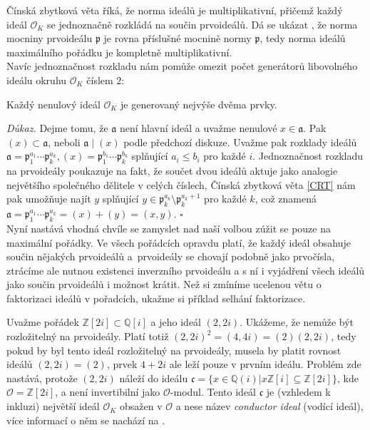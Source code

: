 \documentclass [12pt]{report}
\begin{document}
Čínská zbytková věta říká, že norma ideálů je multiplikativní, přičemž každý ideál $\mathcal{O}_K$ se jednoznačně rozkládá na součin prvoideálů. Dá se ukázat \cite[Věta 4.3.18.]{Pupik}, že norma mocniny prvoideálu $\mathfrak{p}$ je rovna příslušné mocnině normy $\mathfrak{p}$, tedy norma ideálů maximálního pořádku je kompletně multiplikativní.\\

Navíc jednoznačnost rozkladu nám pomůže omezit počet generátorů libovolného ideálu okruhu $\mathcal{O}_K$ číslem $2$:
\begin{veta}
Každý nenulový ideál $\mathcal{O}_K$ je generovaný nejvýše dvěma prvky.
\end{veta}
\noindent \textit{Důkaz.} Dejme tomu, že $\mathfrak{a}$ není hlavní ideál a uvažme nenulové $x \in \mathfrak{a}$. Pak $(x) \subset \mathfrak{a}$, neboli $\mathfrak{a} \mid (x)$ podle předchozí diskuze. Uvažme pak rozklady ideálů $\mathfrak{a} = \mathfrak{p}_1 ^{a_1} \cdots \mathfrak{p}_k ^ {a_k},(x) = \mathfrak{p}_1 ^{b_1} \cdots \mathfrak{p}_k ^{b_k}$ splňující $a_i \leqslant b_i$ pro každé $i$. Jednoznačnost rozkladu na prvoideály poukazuje na fakt, že součet dvou ideálů aktuje jako analogie největšího společného dělitele v celých číslech, Čínská zbytková věta \ref{CRT} nám pak umožňuje najít $y$ splňující $y \in \mathfrak{p}_k^{a_k} \setminus \mathfrak{p}_k^{a_k+1}$ pro každé $k$, což znamená $\mathfrak{a} = \mathfrak{p}_1 ^{a_1} \cdots \mathfrak{p}_k ^ {a_k} = (x)+(y) = (x,y)$. \hfill $\square$\\ 

Nyní nastává vhodná chvíle se zamyslet nad naší volbou zúžit se pouze na maximální pořádky. Ve všech pořádcích opravdu platí, že každý ideál obsahuje součin nějakých prvoideálů a~prvoideály se chovají podobně jako prvočísla, ztrácíme ale nutnou existenci inverzního prvoideálu a s ní i vyjádření všech ideálů jako součin prvoideálů i možnost krátit. Než si zmíníme ucelenou větu o faktorizaci ideálů v pořadcích, ukažme si příklad selhání faktorizace.

\begin{priklad}
Uvažme pořádek $\mathbb{Z}[2i] \subset \mathbb{Q}[i]$ a jeho ideál $(2,2i)$. Ukážeme, že nemůže být rozložitelný na prvoideály. Platí totiž $(2,2i)^2 = (4,4i) = (2)(2,2i)$, tedy pokud by byl tento ideál rozložitelný na prvoideály, musela by platit rovnost ideálů $(2,2i) = (2)$, prvek $4+2i$ ale leží pouze v prvním ideálu. Problém zde nastává, protože $(2,2i)$ náleží do ideálu $\mathfrak{c} = \lbrace x \in \mathbb{Q}(i) \vert x \mathbb{Z}[i] \subseteq \mathbb{Z}[2i] \rbrace$, kde $\mathcal{O} = \mathbb{Z}[2i]$, a není invertibilní jako $\mathcal{O}$-modul. Tento ideál $\mathfrak{c}$ je (vzhledem k inkluzi) největší ideál $\mathcal{O}_K$ obsažen v $\mathcal{O}$ a nese název \textit{conductor ideal} (vodící ideál), více informací o něm se nachází na \cite{Conrad3}.
\end{priklad}
\end{document}
